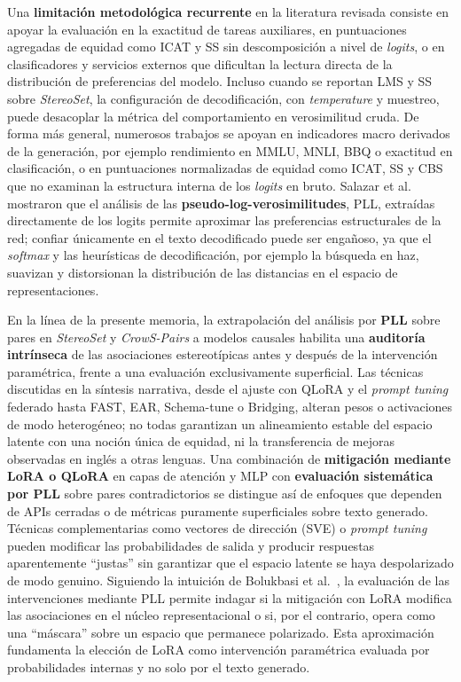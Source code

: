 \documentclass[12pt,a4paper]{report}
\begin{document}
Una \textbf{limitación metodológica recurrente} en la literatura revisada consiste en apoyar la evaluación en la exactitud de tareas auxiliares, en puntuaciones agregadas de equidad como ICAT y SS sin descomposición a nivel de \textit{logits}, o en clasificadores y servicios externos que dificultan la lectura directa de la distribución de preferencias del modelo. Incluso cuando se reportan LMS y SS sobre \textit{StereoSet}, la configuración de decodificación, con \textit{temperature} y muestreo, puede desacoplar la métrica del comportamiento en verosimilitud cruda. De forma más general, numerosos trabajos se apoyan en indicadores macro derivados de la generación, por ejemplo rendimiento en MMLU, MNLI, BBQ o exactitud en clasificación, o en puntuaciones normalizadas de equidad como ICAT, SS y CBS que no examinan la estructura interna de los \textit{logits} en bruto. Salazar et al.\ \cite{salazar_masked_2020} mostraron que el análisis de las \textbf{pseudo-log-verosimilitudes}, PLL, extraídas directamente de los logits permite aproximar las preferencias estructurales de la red; confiar únicamente en el texto decodificado puede ser engañoso, ya que el \textit{softmax} y las heurísticas de decodificación, por ejemplo la búsqueda en haz, suavizan y distorsionan la distribución de las distancias en el espacio de representaciones.

En la línea de la presente memoria, la extrapolación del análisis por \textbf{PLL} sobre pares en \textit{StereoSet} y \textit{CrowS-Pairs} a modelos causales habilita una \textbf{auditoría intrínseca} de las asociaciones estereotípicas antes y después de la intervención paramétrica, frente a una evaluación exclusivamente superficial. Las técnicas discutidas en la síntesis narrativa, desde el ajuste con QLoRA y el \textit{prompt tuning} federado hasta FAST, EAR, Schema-tune o Bridging, alteran pesos o activaciones de modo heterogéneo; no todas garantizan un alineamiento estable del espacio latente con una noción única de equidad, ni la transferencia de mejoras observadas en inglés a otras lenguas. Una combinación de \textbf{mitigación mediante LoRA o QLoRA} en capas de atención y MLP con \textbf{evaluación sistemática por PLL} sobre pares contradictorios se distingue así de enfoques que dependen de APIs cerradas o de métricas puramente superficiales sobre texto generado. Técnicas complementarias como vectores de dirección (SVE) o \textit{prompt tuning} pueden modificar las probabilidades de salida y producir respuestas aparentemente ``justas'' sin garantizar que el espacio latente se haya despolarizado de modo genuino. Siguiendo la intuición de Bolukbasi et al.\ \cite{bolukbasi_man_2016}, la evaluación de las intervenciones mediante PLL permite indagar si la mitigación con LoRA modifica las asociaciones en el núcleo representacional o si, por el contrario, opera como una ``máscara'' sobre un espacio que permanece polarizado. Esta aproximación fundamenta la elección de LoRA como intervención paramétrica evaluada por probabilidades internas y no solo por el texto generado.
\end{document}
